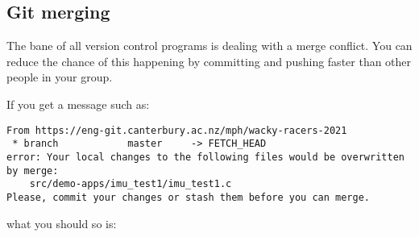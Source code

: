 \begin{Shaded}
\begin{Highlighting}[]
\NormalTok{$ }
\NormalTok{$ }
\NormalTok{$ }
\NormalTok{$ }
\NormalTok{$ }
\NormalTok{$ }
\NormalTok{$ }
\NormalTok{$ }
\NormalTok{$ }
\NormalTok{$ }
\end{Highlighting}
\end{Shaded}

\subsection{Git merging}
\label{git-merging}

The bane of all version control programs is dealing with a merge
conflict. You can reduce the chance of this happening by committing and
pushing faster than other people in your group.

If you get a message such as:

\begin{verbatim}
From https://eng-git.canterbury.ac.nz/mph/wacky-racers-2021
 * branch            master     -> FETCH_HEAD
error: Your local changes to the following files would be overwritten by merge:
    src/demo-apps/imu_test1/imu_test1.c
Please, commit your changes or stash them before you can merge.
\end{verbatim}

what you should so is:

\begin{Shaded}
\begin{Highlighting}[]
\NormalTok{$ }
\NormalTok{$ }
\NormalTok{$ }
\NormalTok{$ }
\NormalTok{$ }
\end{Highlighting}
\end{Shaded}

